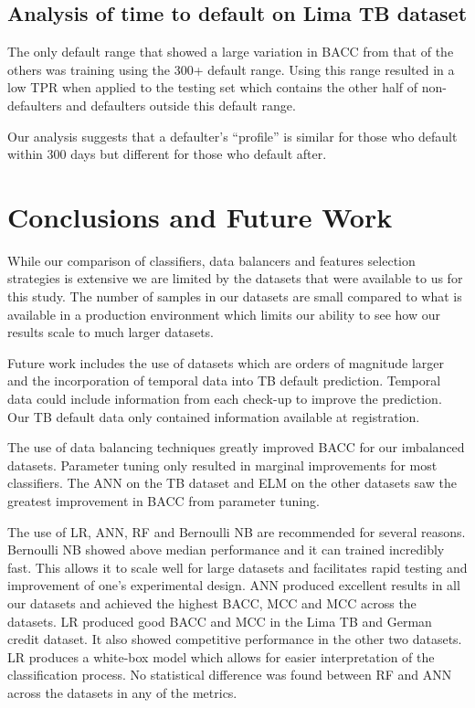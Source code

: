 \documentclass{sig-alternate-05-2015}
\begin{document}
	
	\subsection{Analysis of time to default on Lima TB dataset}
	The only default range that showed a large variation in BACC from that of the others was training using the 300+ default range. Using this range resulted in a low TPR when applied to the testing set which contains the other half of non-defaulters and defaulters outside this default range. 
	
	Our analysis suggests that a defaulter's ``profile'' is similar for those who default within 300 days but different for those who default after.	
	
	\section{Conclusions and Future Work}
	While our comparison of classifiers, data balancers and features selection strategies is extensive we are limited by the datasets that were available to us for this study. The number of samples in our datasets are small compared to what is available in a production environment which limits our ability to see how our results scale to much larger datasets.
	
	Future work includes the use of datasets which are orders of magnitude larger and the incorporation of temporal data into TB default prediction. Temporal data could include information from each check-up to improve the prediction. Our TB default data only contained information available at registration.
	
	The use of data balancing techniques greatly improved BACC for our imbalanced datasets. Parameter tuning only resulted in marginal improvements for most classifiers. The ANN on the TB dataset and ELM on the other datasets saw the greatest improvement in BACC from parameter tuning.
	
	The use of LR, ANN, RF and Bernoulli NB are recommended for several reasons. Bernoulli NB showed above median performance and it can trained incredibly fast. This allows it to scale well for large datasets and facilitates rapid testing and improvement of one's experimental design. ANN produced excellent results in all our datasets and achieved the highest BACC, MCC and MCC across the datasets. LR produced good BACC and MCC in the Lima TB and German credit dataset. It also showed competitive performance in the other two datasets. LR produces a white-box model which allows for easier interpretation of the classification process. No statistical difference was found between RF and ANN across the datasets in any of the metrics.
	
\end{document}
